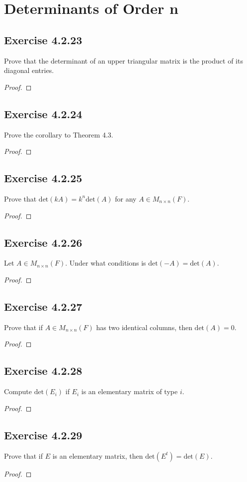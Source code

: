 \section{Determinants of Order n}

\subsection*{Exercise 4.2.23} Prove that the determinant of an upper triangular matrix is the product of its diagonal entries.
\begin{proof}

\end{proof}

\subsection*{Exercise 4.2.24} Prove the corollary to Theorem 4.3.
\begin{proof}

\end{proof}

\subsection*{Exercise 4.2.25} Prove that \( \text{det}(kA) = k^{n} \text{det}(A) \) for any \( A \in {M}_{n \times n}(F) \).
\begin{proof}

\end{proof}

\subsection*{Exercise 4.2.26} Let \( A \in {M}_{n \times n}(F) \). Under what conditions is \( \text{det}(-A) = \text{det}(A) \).
\begin{proof}

\end{proof}

\subsection*{Exercise 4.2.27} Prove that if \( A \in {M}_{n \times n}(F) \) has two identical columns, then \( \text{det}(A) = 0  \).
\begin{proof}

\end{proof}

\subsection*{Exercise 4.2.28} Compute \( \text{det}({E}_{i})  \) if \( {E}_{i} \) is an elementary matrix of type \( i  \).
\begin{proof}

\end{proof}

\subsection*{Exercise 4.2.29} Prove that if \( E  \) is an elementary matrix, then \( \text{det}(E^{t}) = \text{det}(E) \).
\begin{proof}

\end{proof}


